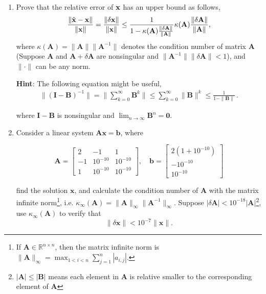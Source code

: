 \documentclass[english,onecolumn]{IEEEtran}
\begin{document}
\begin{enumerate}
    \item Prove that the relative error of $\bf{x}$ has an upper bound as follows,
    \begin{equation*}
        \frac{\|\hat{\mathbf{x}}-\mathbf{x}\|}{\|\mathbf{x}\|} = \frac{\|\delta \bf{x}\|}{\|\bf{x}\|} \leq \frac{1}{1-\kappa(\mathbf{A})\frac{\|\delta \mathbf{A}\|}{\|\mathbf{A}\|}}\kappa(\mathbf{A})\frac{\|\delta \mathbf{A}\|}{\|\mathbf{A}\|},
    \end{equation*}
    where $\kappa(\mathbf{A}) = \|\mathbf{A}\|\|\mathbf{A}^{-1}\|$ denotes the condition number of matrix $\mathbf{A}$ (Suppose $\mathbf{A}$ and $\mathbf{A}+\delta \mathbf{A}$ are nonsingular and $\|\mathbf{A}^{-1}\|\|\delta \mathbf{A}\|<1$), and $\|\cdot\|$ can be any norm.
    
    \textbf{Hint}: The following equation might be useful,
    \begin{align*}
        \|(\mathbf{I}-\mathbf{B})^{-1}\| =  \|\sum_{k = 0}^{\infty} \mathbf{B}^k\| \leq \sum_{k = 0}^{\infty} \|\mathbf{B}\|^k \leq  \frac{1}{1-\|\mathbf{B}\|}\,.
    \end{align*}
    
    
    where $\mathbf{I}-\mathbf{B}$ is nonsingular and $\lim_{n\to \infty}\mathbf{B}^n = \mathbf{0}$.
    
    \item Consider a linear system $\mathbf{A}\mathbf{x} = \mathbf{b}$, where
    
    \[
        \mathbf{A} = \begin{bmatrix}2 & -1 & 1 \\ -1 &10^{-10} &10^{-10}\\ 1 & 10^{-10} & 10^{-10}  \end{bmatrix},\quad \mathbf{b} = \begin{bmatrix}2(1+10^{-10}) \\ -10^{-10} \\10^{-10} \end{bmatrix}
    \]
    
    find the solution $\mathbf{x}$, and calculate the condition number of $\mathbf{A}$ with the matrix infinite norm\footnote{If $\mathbf{A}\in\mathbb{R}^{n\times n}$, then the matrix infinite norm is  $\|\mathbf{A}\|_{\infty} = \max_{1<i<n}\sum_{j = 1}^n|a_{i,j}|$.}, i.e. $\kappa_\infty(\mathbf{A}) = \|\mathbf{A}\|_\infty\|\mathbf{A}^{-1}\|_\infty$. Suppose $|\delta\mathbf{A}|<10^{-18}|\mathbf{A}|$\footnote{$|\mathbf{A}|\leq |\mathbf{B}|$ means each element in $\mathbf{A}$ is relative smaller to the corresponding element of $\mathbf{A}$}, use $\kappa_\infty(\mathbf{A})$ to verify that 
    \[
        \|\delta \mathbf{x}\|< 10^{-7} \|\mathbf{x}\|. 
    \]
    

\end{enumerate}
\end{document}
